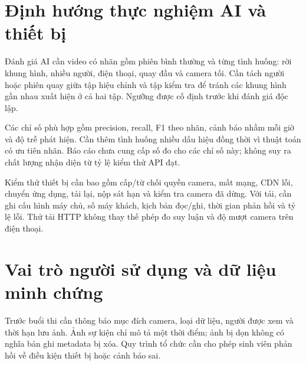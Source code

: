 \section{Định hướng thực nghiệm AI và thiết bị}
Đánh giá AI cần video có nhãn gồm phiên bình thường và từng tình huống: rời khung hình, nhiều người, điện thoại, quay đầu và camera tối. Cần tách người hoặc phiên quay giữa tập hiệu chỉnh và tập kiểm tra để tránh các khung hình gần nhau xuất hiện ở cả hai tập. Ngưỡng được cố định trước khi đánh giá độc lập.

Các chỉ số phù hợp gồm precision, recall, F1 theo nhãn, cảnh báo nhầm mỗi giờ và độ trễ phát hiện. Cần thêm tình huống nhiều dấu hiệu đồng thời vì thuật toán có ưu tiên nhãn. Báo cáo chưa cung cấp số đo cho các chỉ số này; không suy ra chất lượng nhận diện từ tỷ lệ kiểm thử API đạt.

Kiểm thử thiết bị cần bao gồm cấp/từ chối quyền camera, mất mạng, CDN lỗi, chuyển ứng dụng, tải lại, nộp sát hạn và kiểm tra camera đã dừng. Với tải, cần ghi cấu hình máy chủ, số máy khách, kịch bản đọc/ghi, thời gian phản hồi và tỷ lệ lỗi. Thử tải HTTP không thay thế phép đo suy luận và độ mượt camera trên điện thoại.

\section{Vai trò người sử dụng và dữ liệu minh chứng}
Trước buổi thi cần thông báo mục đích camera, loại dữ liệu, người được xem và thời hạn lưu ảnh. Ảnh sự kiện chỉ mô tả một thời điểm; ảnh bị dọn không có nghĩa bản ghi metadata bị xóa. Quy trình tổ chức cần cho phép sinh viên phản hồi về điều kiện thiết bị hoặc cảnh báo sai.

